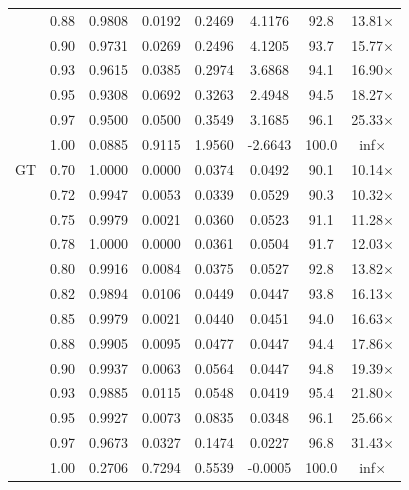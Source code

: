 \begin{table}[ht]
{\begin{tabular}{ll|cccc|cc}
 & 0.88 & 0.9808 & 0.0192 & 0.2469 & 4.1176 & 92.8 & 13.81$\times$ \\
 & 0.90 & 0.9731 & 0.0269 & 0.2496 & 4.1205 & 93.7 & 15.77$\times$ \\
 & 0.93 & 0.9615 & 0.0385 & 0.2974 & 3.6868 & 94.1 & 16.90$\times$ \\
 & 0.95 & 0.9308 & 0.0692 & 0.3263 & 2.4948 & 94.5 & 18.27$\times$ \\
 & 0.97 & 0.9500 & 0.0500 & 0.3549 & 3.1685 & 96.1 & 25.33$\times$ \\
 & 1.00 & 0.0885 & 0.9115 & 1.9560 & -2.6643 & 100.0 & inf$\times$ \\
\midrule
GT & 0.70 & 1.0000 & 0.0000 & 0.0374 & 0.0492 & 90.1 & 10.14$\times$ \\
 & 0.72 & 0.9947 & 0.0053 & 0.0339 & 0.0529 & 90.3 & 10.32$\times$ \\
 & 0.75 & 0.9979 & 0.0021 & 0.0360 & 0.0523 & 91.1 & 11.28$\times$ \\
 & 0.78 & 1.0000 & 0.0000 & 0.0361 & 0.0504 & 91.7 & 12.03$\times$ \\
 & 0.80 & 0.9916 & 0.0084 & 0.0375 & 0.0527 & 92.8 & 13.82$\times$ \\
 & 0.82 & 0.9894 & 0.0106 & 0.0449 & 0.0447 & 93.8 & 16.13$\times$ \\
 & 0.85 & 0.9979 & 0.0021 & 0.0440 & 0.0451 & 94.0 & 16.63$\times$ \\
 & 0.88 & 0.9905 & 0.0095 & 0.0477 & 0.0447 & 94.4 & 17.86$\times$ \\
 & 0.90 & 0.9937 & 0.0063 & 0.0564 & 0.0447 & 94.8 & 19.39$\times$ \\
 & 0.93 & 0.9885 & 0.0115 & 0.0548 & 0.0419 & 95.4 & 21.80$\times$ \\
 & 0.95 & 0.9927 & 0.0073 & 0.0835 & 0.0348 & 96.1 & 25.66$\times$ \\
 & 0.97 & 0.9673 & 0.0327 & 0.1474 & 0.0227 & 96.8 & 31.43$\times$ \\
 & 1.00 & 0.2706 & 0.7294 & 0.5539 & -0.0005 & 100.0 & inf$\times$ \\
\bottomrule
\end{tabular}}
\end{table}